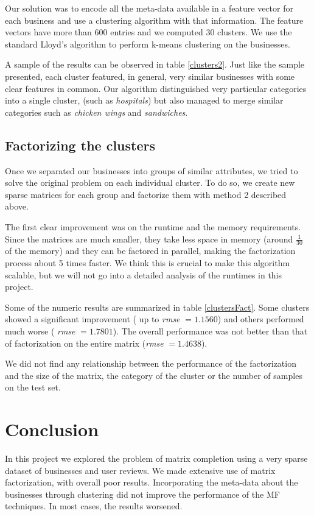 \documentclass[12pt]{article}
\begin{document}
Our solution was to encode all the meta-data available in a feature vector for each business and use a clustering algorithm with that information. The feature vectors have more than 600 entries and we computed 30 clusters. We use the standard Lloyd's algorithm \cite{lamport94} to perform k-means clustering on the businesses.  

A sample of the results can be observed in table \ref{clusters2}. Just like the sample presented, each cluster featured, in general, very similar businesses with some clear features in common. Our algorithm distinguished very particular categories into a single cluster, (such as \emph{hospitals}) but also managed to merge similar categories such as \emph{chicken wings} and \emph{sandwiches}.


\subsection{Factorizing the clusters}

Once we separated our businesses into groups of similar attributes, we tried to solve the original problem on each individual cluster. To do so, we create new sparse matrices for each group and factorize them with method 2 described above. 

The first clear improvement was on the runtime and the memory requirements. Since the matrices are much smaller, they take less space in memory (around $\frac{1}{30}$ of the memory) and they can be factored in parallel, making the factorization process about 5 times faster. We think this is crucial to make this algorithm scalable, but we will not go into a detailed analysis of the runtimes in this project.

Some of the numeric results are summarized in table \ref{clustersFact}. Some clusters showed a significant improvement ( up to \emph{rmse} $= 1.1560$) and others performed much worse ( \emph{rmse} $= 1.7801$). The overall performance was not better than that of factorization on the entire matrix (\emph{rmse} $= 1.4638 $).

We did not find any relationship between the performance of the factorization and the size of the matrix, the category of the cluster or the number of samples on the test set. 

\section{Conclusion}

In this project we explored the problem of matrix completion using a very sparse dataset of businesses and user reviews. We made extensive use of matrix factorization, with overall poor results. Incorporating the meta-data about the businesses through clustering did not improve the performance of the MF techniques. In most cases, the results worsened.
\end{document}
